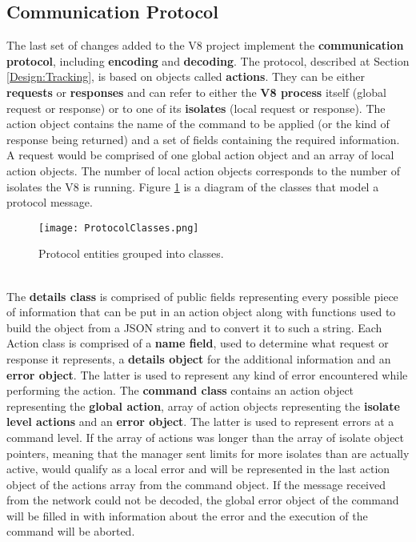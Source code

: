 \documentclass{l4proj}
\begin{document}
\subsection{Communication Protocol}
\hspace*{1em} The last set of changes added to the V8 project implement the \textbf{communication protocol}, including \textbf{encoding} and \textbf{decoding}. The protocol, described at Section \ref{Design:Tracking}, is based on objects called \textbf{actions}. They can be either \textbf{requests} or \textbf{responses} and can refer to either the \textbf{V8 process} itself (global request or response) or to one of its \textbf{isolates} (local request or response). The action object contains the name of the command to be applied (or the kind of response being returned) and a set of fields containing the required information. A request would be comprised of one global action object and an array of local action objects. The number of local action objects corresponds to the number of isolates the V8 is running. Figure \ref{protocoldiag} is a diagram of the classes that model a protocol message.     
\begin{figure}[!ht]
  \centering
    \texttt{[image: ProtocolClasses.png]}
  \caption{Protocol entities grouped into classes.}
  \label{protocoldiag}
\end{figure}
\\
\hspace*{1em} The \textbf{details class} is comprised of public fields representing every possible piece of information that can be put in an action object along with functions used to build the object from a JSON string and to convert it to such a string. Each Action class is comprised of a \textbf{name field}, used to determine what request or response it represents, a \textbf{details object} for the additional information and an \textbf{error object}. The latter is used to represent any kind of error encountered while performing the action. The \textbf{command class} contains an action object representing the \textbf{global action}, array of action objects representing the \textbf{isolate level actions} and an \textbf{error object}. The latter is used to represent errors at a command level. If the array of actions was longer than the array of isolate object pointers, meaning that the manager sent limits for more isolates than are actually active, would qualify as a local error and will be represented in the last action object of the actions array from the command object. If the message received from the network could not be decoded, the global error object of the command will be filled in with information about the error and the execution of the command will be aborted.
\end{document}
